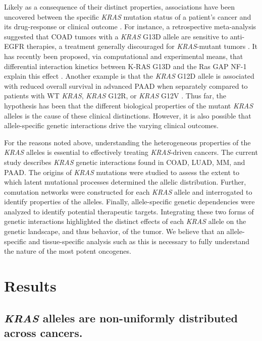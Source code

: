 \documentclass[english, 10pt, letterpaper]{article}
\newcommand{\KRAS}{\emph{KRAS}}
\newcommand{\kras}{K-RAS}
\begin{document}
Likely as a consequence of their distinct properties, associations have been uncovered between the specific \KRAS{} mutation status of a patient's cancer and its drug-response or clinical outcome \cite{Haigis2017, Li2018}.
For instance, a retrospective meta-analysis suggested that COAD tumors with a \KRAS{} G13D allele are sensitive to anti-EGFR therapies, a treatment generally discouraged for \KRAS{}-mutant tumors \cite{DeRoock2010}. 
It has recently been proposed, via computational and experimental means, that differential interaction kinetics between \kras{} G13D and the Ras GAP NF-1 explain this effect \cite{McFall2019, Rabara2019, Zafra2019}.
Another example is that the \KRAS{} G12D allele is associated with reduced overall survival in advanced PAAD when separately compared to patients with WT \KRAS{}, \KRAS{} G12R, or \KRAS{} G12V \cite{Bournet2016}.
Thus far, the hypothesis has been that the different biological properties of the mutant \KRAS{} alleles is the cause of these clinical distinctions.
However, it is also possible that allele-specific genetic interactions drive the varying clinical outcomes.

For the reasons noted above, understanding the heterogeneous properties of the \KRAS{} alleles is essential to effectively treating \KRAS{}-driven cancers.
The current study describes \KRAS{} genetic interactions found in COAD, LUAD, MM, and PAAD.
The origins of \KRAS{} mutations were studied to assess the extent to which latent mutational processes determined the allelic distribution.
Further, comutation networks were constructed for each \KRAS{} allele and interrogated to identify properties of the alleles.
Finally, allele-specific genetic dependencies were analyzed to identify potential therapeutic targets.
Integrating these two forms of genetic interactions highlighted the distinct effects of each \KRAS{} allele on the genetic landscape, and thus behavior, of the tumor.
We believe that an allele-specific and tissue-specific analysis such as this is necessary to fully understand the nature of the most potent oncogenes.



\section*{Results}

\subsection*{\KRAS{} alleles are non-uniformly distributed across cancers.}
\end{document}
